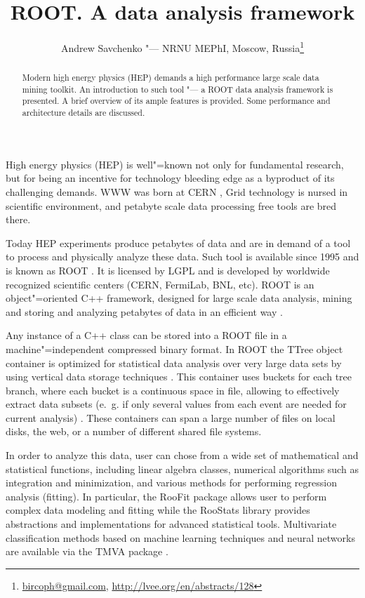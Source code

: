 \documentclass[10pt, a5paper]{article}
\begin{document}
\title{ROOT. A data analysis framework}
\author{Andrew Savchenko "--- NRNU MEPhI, Moscow, Russia\footnote{\url{bircoph@gmail.com}, \url{http://lvee.org/en/abstracts/128}}}
\maketitle
\begin{abstract}
Modern high energy physics (HEP) demands a high perfor\-mance large scale data mining toolkit. An introduction to such tool "--- a ROOT data analysis framework is presented. A brief overview of its ample features is provided. Some performance and architecture details are discussed.
\end{abstract}
High energy physics (HEP) is well"=known not only for fundamental research, but for being an incentive for technology bleeding edge as a byproduct of its challenging demands. WWW was born at CERN \cite{Savchenko1}, Grid technology is nursed in scientific environment, and petabyte scale data processing free tools are bred there.

Today HEP experiments produce petabytes of data and are in de\-mand of a tool to process and physically analyze these data. Such tool is available since 1995 and is known as ROOT \cite{Savchenko2}. It is licensed by LGPL and is developed by worldwide recognized scientific centers (CERN, FermiLab, BNL, etc). ROOT is an object"=oriented C++ framework, designed for large scale data analysis, mining and storing and analyzing petabytes of data in an efficient way \cite{Savchenko3}.

Any instance of a C++ class can be stored into a ROOT file in a machine"=independent compressed binary format. In ROOT the TTree object container is optimized for statistical data analysis over very large data sets by using vertical data storage techniques \cite{Savchenko4}. This container uses buckets for each tree branch, where each bucket is a continuous space in file, allowing to effectively extract data subsets (e.~g. if only several values from each event are needed for current analysis) \cite{Savchenko5}. These containers can span a large number of files on local disks, the web, or a number of different shared file systems.

In order to analyze this data, user can chose from a wide set of mathematical and statistical functions, including linear algebra classes, numerical algorithms such as integration and minimization, and various methods for performing regression analysis (fitting). In particular, the RooFit package \cite{Savchenko6} allows user to perform complex data modeling and fitting while the RooStats library provides abstractions and implementations for advanced statistical tools. Multivariate classification methods based on machine learning techniques and neural networks are available via the TMVA package \cite{Savchenko7}.
\end{document}
